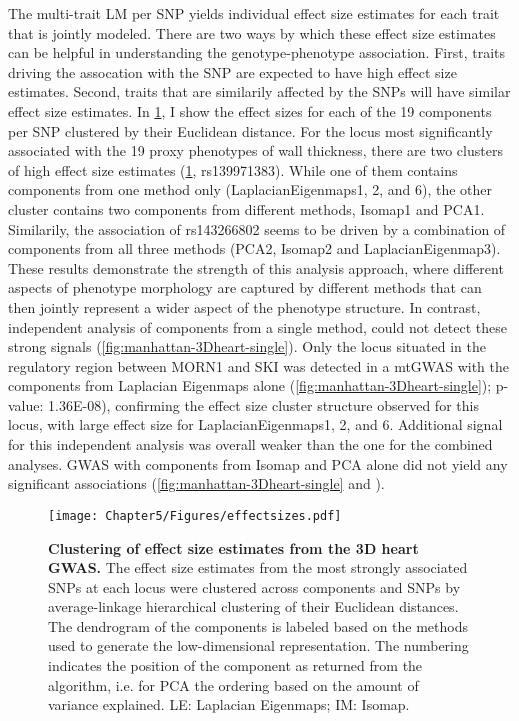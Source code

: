 The multi-trait LM per SNP yields individual effect size estimates for each trait that is jointly modeled. There are two ways by which these effect size estimates can be helpful in understanding the genotype-phenotype association. First, traits driving the assocation with the SNP are expected to have high effect size estimates. Second, traits that are similarily affected by the SNPs will have similar effect size estimates.  In \cref{fig:effectsizes-heart}, I show the effect sizes for each of the \num{19} components per SNP clustered by their Euclidean distance. For the locus most significantly associated with the \num{19} proxy phenotypes of wall thickness, there are two clusters of high effect size estimates (\cref{fig:effectsizes-heart}, rs139971383). While one of them contains components from one method only (LaplacianEigenmaps1, 2, and 6), the other cluster contains two components from different methods, Isomap1 and PCA1. Similarily, the association of rs143266802 seems to be driven by a combination of components from all three methods (PCA2, Isomap2 and LaplacianEigenmap3). These results demonstrate the strength of this analysis approach, where different aspects of phenotype morphology are captured by different methods that can then jointly represent a wider aspect of the phenotype structure. In contrast, independent analysis of components from a single method, could not detect these strong signals (\cref{fig:manhattan-3Dheart-single}). Only the locus situated in the regulatory region between MORN1 and SKI was detected in a mtGWAS with the components from Laplacian Eigenmaps alone (\cref{fig:manhattan-3Dheart-single}); p-value: \num{1.36E-08}), confirming the effect size cluster structure observed for this locus, with large effect size for LaplacianEigenmaps1, 2, and 6. Additional signal for this independent analysis was overall weaker than the one for the combined analyses. GWAS with components from Isomap and PCA alone did not yield any significant associations (\cref{fig:manhattan-3Dheart-single} and ). 

\begin{figure}[hbtp]
	\centering
	\texttt{[image: Chapter5/Figures/effectsizes.pdf]}
	\caption[\textbf{Clustering of effect size estimates from the 3D heart GWAS. }]{\textbf{Clustering of effect size estimates from the 3D heart GWAS. } The effect size estimates from the most strongly associated SNPs at each locus were clustered across components and SNPs by average-linkage hierarchical clustering of their Euclidean distances. The dendrogram of the components is labeled based on the methods used to generate the low-dimensional representation. The numbering indicates the position of the component as returned from the algorithm, i.e. for PCA the ordering based on the amount of variance explained. LE: Laplacian Eigenmaps; IM: Isomap.} 
	 	\label{fig:effectsizes-heart}
\end{figure}

